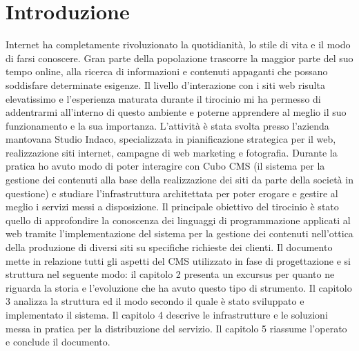 \chapter{Introduzione}
\label{chap:Introduction}

Internet ha completamente rivoluzionato la quotidianità, lo stile di vita e il modo di farsi conoscere. Gran parte della popolazione trascorre la maggior parte del suo tempo online, alla ricerca di informazioni e contenuti appaganti che possano soddisfare determinate esigenze. Il livello d'interazione con i siti web risulta elevatissimo e l'esperienza maturata durante il tirocinio mi ha permesso di addentrarmi all'interno di questo ambiente e poterne apprendere al meglio il suo funzionamento e la sua importanza.
L'attività è stata svolta presso l'azienda mantovana Studio Indaco, specializzata in pianificazione strategica per il web, realizzazione siti internet, campagne di web marketing e fotografia. Durante la pratica ho avuto modo di poter interagire con Cubo CMS (il sistema per la gestione dei contenuti alla base della realizzazione dei siti da parte della società in questione) e studiare l'infrastruttura architettata per poter erogare e gestire al meglio i servizi messi a disposizione.
Il principale obiettivo del tirocinio è stato quello di approfondire la conoscenza dei linguaggi di programmazione applicati al web tramite l'implementazione del sistema per la gestione dei contenuti nell'ottica della produzione di diversi siti su specifiche richieste dei clienti. \hfill \break \break
Il documento mette in relazione tutti gli aspetti del CMS utilizzato in fase di progettazione e si struttura nel seguente modo: il capitolo 2 presenta un excursus per quanto ne riguarda la storia e l'evoluzione che ha avuto questo tipo di strumento.
Il capitolo 3 analizza la struttura ed il modo secondo il quale è stato sviluppato e implementato il sistema. Il capitolo 4 descrive le infrastrutture e le soluzioni messa in pratica per la distribuzione del servizio. Il capitolo 5 riassume l'operato e conclude il documento.